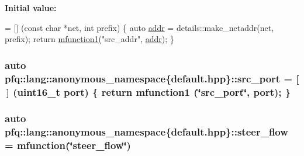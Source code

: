 {\bfseries Initial value\+:}
\begin{DoxyCode}
= [] (\textcolor{keyword}{const} \textcolor{keywordtype}{char} *net, \textcolor{keywordtype}{int} prefix)
        \{
            \textcolor{keyword}{auto} \hyperlink{namespacepfq_1_1lang_1_1anonymous__namespace_02default_8hpp_03_a13cabe468839119d8d68540e3c60718b}{addr} = details::make\_netaddr(net, prefix);
            \textcolor{keywordflow}{return} \hyperlink{namespacepfq_1_1lang_a68d775c68562fbd0ab9ef213f2519499}{mfunction1}(\textcolor{stringliteral}{"src\_addr"}, \hyperlink{namespacepfq_1_1lang_1_1anonymous__namespace_02default_8hpp_03_a13cabe468839119d8d68540e3c60718b}{addr});
        \}
\end{DoxyCode}
\hypertarget{namespacepfq_1_1lang_1_1anonymous__namespace_02default_8hpp_03_ad1645151270994a4f396565b70233b73}{
\subsubsection[{src\+\_\+port}]{\setlength{\rightskip}{0pt plus 5cm}auto pfq\+::lang\+::anonymous\+\_\+namespace\{default.\+hpp\}\+::src\+\_\+port = \mbox{[}$\,$\mbox{]} (uint16\+\_\+t {\bf port}) \{ return {\bf mfunction1} (\char`\"{}src\+\_\+port\char`\"{}, port); \}}}\label{namespacepfq_1_1lang_1_1anonymous__namespace_02default_8hpp_03_ad1645151270994a4f396565b70233b73}
\hypertarget{namespacepfq_1_1lang_1_1anonymous__namespace_02default_8hpp_03_adeb44c976ac903e7b13addb65ac41f9f}{
\subsubsection[{steer\+\_\+flow}]{\setlength{\rightskip}{0pt plus 5cm}auto pfq\+::lang\+::anonymous\+\_\+namespace\{default.\+hpp\}\+::steer\+\_\+flow = {\bf mfunction}(\char`\"{}steer\+\_\+flow\char`\"{})}}\label{namespacepfq_1_1lang_1_1anonymous__namespace_02default_8hpp_03_adeb44c976ac903e7b13addb65ac41f9f}
